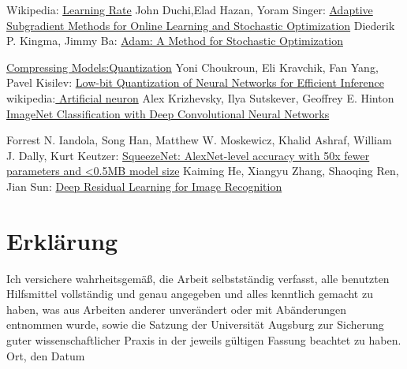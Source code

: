 \documentclass[12pt,a4paper]{scrartcl}
\numberwithin{equation}{section}
\begin{document}
\begin{thebibliography}{lem00}
	Wikipedia:
		\href{https://en.wikipedia.org/wiki/Learning_rate}{Learning Rate}
		John Duchi,Elad Hazan, Yoram Singer:
		\href{http://www.jmlr.org/papers/volume12/duchi11a/duchi11a.pdf}{Adaptive Subgradient Methods for
			Online Learning and Stochastic Optimization}
		Diederik P. Kingma, Jimmy Ba:
		\href{https://arxiv.org/abs/1412.6980}{Adam: A Method for Stochastic Optimization}
		
		\href{https://nervanasystems.github.io/distiller/quantization.html}{Compressing Models:Quantization}
		Yoni Choukroun, Eli Kravchik, Fan Yang, Pavel Kisilev:
			\href{https://arxiv.org/abs/1902.06822}{Low-bit Quantization of Neural Networks for Efficient Inference}
	wikipedia:\href{https://en.wikipedia.org/wiki/Artificial_neuron}{ Artificial neuron}
	Alex Krizhevsky, Ilya Sutskever, Geoffrey E. Hinton
		\href{https://papers.nips.cc/paper/4824-imagenet-classification-with-deep-convolutional-neural-networks.pdf}{ImageNet Classification with Deep Convolutional Neural Networks}
  
  	Forrest N. Iandola, Song Han, Matthew W. Moskewicz, Khalid Ashraf, William J. Dally, Kurt Keutzer:
  	\href{https://arxiv.org/abs/1602.07360}{SqueezeNet: AlexNet-level accuracy with 50x fewer parameters and <0.5MB model size}
  		Kaiming He, Xiangyu Zhang, Shaoqing Ren, Jian Sun:
  		\href{https://arxiv.org/pdf/1512.03385.pdf}{Deep Residual Learning for Image Recognition}
\end{thebibliography}

 
      

\newpage
  
 \thispagestyle{empty}


\vspace*{8cm}


\section*{Erklärung}

Ich  versichere  wahrheitsgemäß,  die  Arbeit selbstständig verfasst,  alle  benutzten  Hilfsmittel  vollständig  und  genau  angegeben  und  alles kenntlich  gemacht  zu  haben,  was  aus  Arbeiten  anderer  unverändert  oder  mit  Abänderungen entnommen  wurde,  sowie die Satzung  der  Universität Augsburg  zur  Sicherung guter wissenschaftlicher Praxis in der jeweils gültigen Fassung beachtet zu haben.
\\[2ex] 

\noindent
Ort, den Datum\\[5ex]

\end{document}
